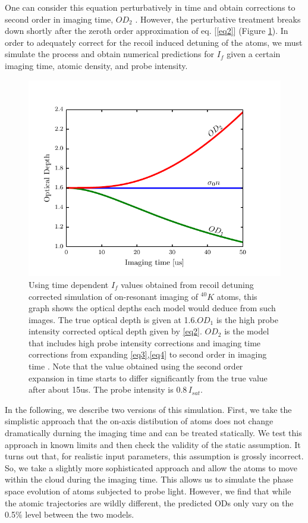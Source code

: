 \documentclass[12pt]{iopart}
\begin{document}
\par One can consider this equation perturbatively in time and obtain corrections to second order in imaging time, $OD_2$  \cite{LJLthesis}. However, the perturbative treatment breaks down shortly after the zeroth order approximation of eq. [\ref{eq2}] (Figure \ref{fig:ODcorrections}). In order to adequately correct for the recoil induced detuning of the atoms, we must simulate the process and obtain numerical predictions for $I_f$ given a certain imaging time, atomic density, and probe intensity. 
\begin{figure}
	\includegraphics*{figure2.pdf}
\caption{Using time dependent $I_f$ values obtained from recoil detuning corrected simulation of on-resonant imaging of $^{40}K$ atoms, this graph shows the optical depths each model would deduce from such images. The true optical depth is given at 1.6.$OD_1$ is the high probe intensity corrected optical depth given by \ref{eq2}. $OD_2$ is the model that includes high probe intensity corrections and imaging time corrections from expanding \ref{eq3},\ref{eq4} to second order in imaging time \cite{LJLthesis}. Note that the value obtained using the second order expansion in time starts to differ significantly from the true value after about 15us. The probe intensity is $0.8\, I_{sat}$. }  
\label{fig:ODcorrections}
\end{figure}
\par In the following, we describe two versions of this simulation. First, we take the simplistic approach that the on-axis distibution of atoms does not change dramatically durning the imaging time and can be treated statically. We test this approach in known limits and then check the validity of the static assumption. It turns out that, for realistic input parameters, this assumption is grossly incorrect. So, we take a slightly more sophisticated approach and allow the atoms to move within the cloud during the imaging time. This allows us to simulate the phase space evolution of atoms subjected to probe light. However,   
 we find that  while the atomic trajectories are wildly different, the predicted ODs only vary on the 0.5$\%$ level between the two models. 
\end{document}
